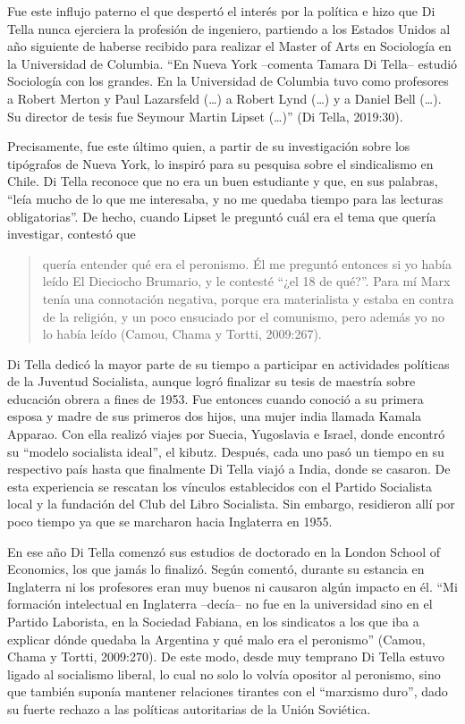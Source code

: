 Fue este influjo paterno el que despertó el interés por la política e hizo que Di Tella nunca ejerciera la profesión de ingeniero, partiendo a los Estados Unidos al año siguiente de haberse recibido para realizar el Master of Arts en Sociología en la Universidad de Columbia. ``En Nueva York --comenta Tamara Di Tella-- estudió Sociología con los grandes. En la Universidad de Columbia tuvo como profesores a Robert Merton y Paul Lazarsfeld (\dots) a Robert Lynd (\dots) y a Daniel Bell (\dots). Su director de tesis fue Seymour Martin Lipset (\dots)'' (Di Tella, 2019:30).

Precisamente, fue este último quien, a partir de su investigación sobre los tipógrafos de Nueva York, lo inspiró para su pesquisa sobre el sindicalismo en Chile. Di Tella reconoce que no era un buen estudiante y que, en sus palabras, ``leía mucho de lo que me interesaba, y no me quedaba tiempo para las lecturas obligatorias''. De hecho, cuando Lipset le preguntó cuál era el tema que quería investigar, contestó que

\begin{quote}
quería entender qué era el peronismo. Él me preguntó entonces si yo había leído El Dieciocho Brumario, y le contesté ``¿el 18 de qué?''. Para mí Marx tenía una connotación negativa, porque era materialista y estaba en contra de la religión, y un poco ensuciado por el comunismo, pero además yo no lo había leído (Camou, Chama y Tortti, 2009:267).
\end{quote}

Di Tella dedicó la mayor parte de su tiempo a participar en actividades políticas de la Juventud Socialista, aunque logró finalizar su tesis de maestría sobre educación obrera a fines de 1953. Fue entonces cuando conoció a su primera esposa y madre de sus primeros dos hijos, una mujer india llamada Kamala Apparao. Con ella realizó viajes por Suecia, Yugoslavia e Israel, donde encontró su ``modelo socialista ideal'', el kibutz. Después, cada uno pasó un tiempo en su respectivo país hasta que finalmente Di Tella viajó a India, donde se casaron. De esta experiencia se rescatan los vínculos establecidos con el Partido Socialista local y la fundación del Club del Libro Socialista. Sin embargo, residieron allí por poco tiempo ya que se marcharon hacia Inglaterra en 1955.

En ese año Di Tella comenzó sus estudios de doctorado en la London School of Economics, los que jamás lo finalizó. Según comentó, durante su estancia en Inglaterra ni los profesores eran muy buenos ni causaron algún impacto en él. ``Mi formación intelectual en Inglaterra --decía-- no fue en la universidad sino en el Partido Laborista, en la Sociedad Fabiana, en los sindicatos a los que iba a explicar dónde quedaba la Argentina y qué malo era el peronismo'' (Camou, Chama y Tortti, 2009:270). De este modo, desde muy temprano Di Tella estuvo ligado al socialismo liberal, lo cual no solo lo volvía opositor al peronismo, sino que también suponía mantener relaciones tirantes con el ``marxismo duro'', dado su fuerte rechazo a las políticas autoritarias de la Unión Soviética.

